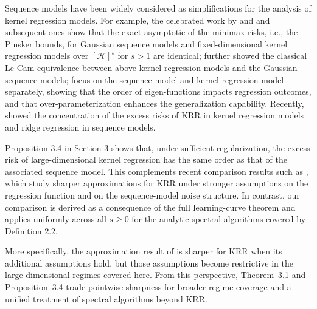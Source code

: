 \documentclass{article}
\theoremstyle{plain}
\theoremstyle{definition}
\theoremstyle{remark}
\begin{document}
\begin{appendix}
Sequence models have been widely considered as simplifications for the analysis of kernel regression models. For example, the celebrated work by \cite{pinsker1980optimal} and \cite{nussbaum1985spline} and subsequent ones show that the exact asymptotic of the minimax risks, i.e., the Pinsker bounds, for Gaussian sequence models and fixed-dimensional kernel regression models over \( [\mathcal{H}]^{s} \) for \( s > 1 \) are identical; \cite{brown1996asymptotic, carter2006continous, reiss2008asymptotic} further showed the classical Le Cam equivalence between above kernel regression models and the Gaussian sequence models;
\cite{li2024improving, li2025diagonal} focus on the sequence model and kernel regression model separately, showing that the order of eigen-functions impacts regression outcomes, and that over-parameterization enhances the generalization capability.
Recently, \cite{cheng2022dimension, misiakiewicz2024non} showed the concentration of the excess risks of KRR in kernel regression models and ridge regression in sequence models.




Proposition 3.4 in Section 3 shows that, under sufficient regularization, the excess risk of large-dimensional kernel regression has the same order as that of the associated sequence model. This complements recent comparison results such as \cite{cheng2022dimension, misiakiewicz2024non}, which study sharper approximations for KRR under stronger assumptions on the regression function and on the sequence-model noise structure. In contrast, our comparison is derived as a consequence of the full learning-curve theorem and applies uniformly across all $s\ge 0$ for the analytic spectral algorithms covered by Definition 2.2.


More specifically, the approximation result of \cite{misiakiewicz2024non} is sharper for KRR when its additional assumptions hold, but those assumptions become restrictive in the large-dimensional regimes covered here. From this perspective, Theorem~3.1 and Proposition~3.4 trade pointwise sharpness for broader regime coverage and a unified treatment of spectral algorithms beyond KRR.

\end{appendix}
\end{document}
